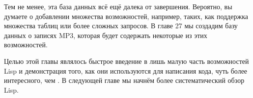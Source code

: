 Тем не менее, эта база данных всё ещё далека от завершения. Вероятно, вы думаете о
добавлении множества возможностей, например, таких, как поддержка множества таблиц или
более сложных запросов. В главе 27 мы создадим базу данных о записях MP3, которая будет
содержать некоторые из этих возможностей.

Целью этой главы являлось быстрое введение в лишь малую часть возможностей Lisp и
демонстрация того, как они используются для написания кода, чуть более интересного, чем
. В следующей главе мы начнём более систематический обзор Lisp.


